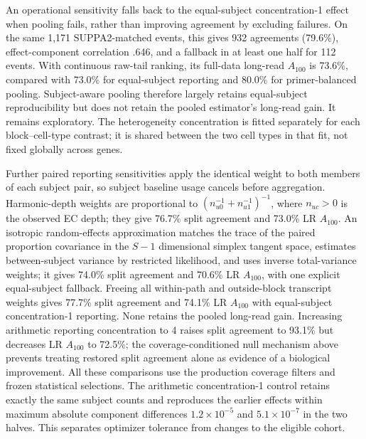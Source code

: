 \documentclass[11pt]{article}
\begin{document}
An operational sensitivity falls back to the equal-subject concentration-1 effect when pooling fails, rather than improving agreement by excluding failures. On the same 1,171 SUPPA2-matched events, this gives 932 agreements (79.6\%), effect-component correlation .646, and a fallback in at least one half for 112 events. With continuous raw-tail ranking, its full-data long-read \(A_{100}\) is 73.6\%, compared with 73.0\% for equal-subject reporting and 80.0\% for primer-balanced pooling. Subject-aware pooling therefore largely retains equal-subject reproducibility but does not retain the pooled estimator's long-read gain. It remains exploratory. The heterogeneity concentration is fitted separately for each block--cell-type contrast; it is shared between the two cell types in that fit, not fixed globally across genes.

Further paired reporting sensitivities apply the identical weight to both members of each subject pair, so subject baseline usage cancels before aggregation. Harmonic-depth weights are proportional to \((n_{u0}^{-1}+n_{u1}^{-1})^{-1}\), where \(n_{uc}>0\) is the observed EC depth; they give 76.7\% split agreement and 73.0\% LR \(A_{100}\). An isotropic random-effects approximation matches the trace of the paired proportion covariance in the \(S-1\) dimensional simplex tangent space, estimates between-subject variance by restricted likelihood, and uses inverse total-variance weights; it gives 74.0\% split agreement and 70.6\% LR \(A_{100}\), with one explicit equal-subject fallback. Freeing all within-path and outside-block transcript weights gives 77.7\% split agreement and 74.1\% LR \(A_{100}\) with equal-subject concentration-1 reporting. None retains the pooled long-read gain. Increasing arithmetic reporting concentration to 4 raises split agreement to 93.1\% but decreases LR \(A_{100}\) to 72.5\%; the coverage-conditioned null mechanism above prevents treating restored split agreement alone as evidence of a biological improvement. All these comparisons use the production coverage filters and frozen statistical selections. The arithmetic concentration-1 control retains exactly the same subject counts and reproduces the earlier effects within maximum absolute component differences \(1.2\times10^{-5}\) and \(5.1\times10^{-7}\) in the two halves. This separates optimizer tolerance from changes to the eligible cohort.
\end{document}
